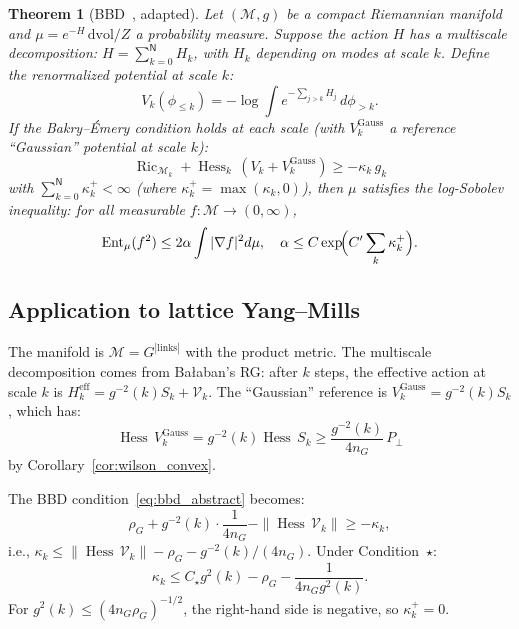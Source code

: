 \documentclass[11pt,a4paper]{article}
\theoremstyle{plain}
\newtheorem{theorem}{Theorem}[section]
\theoremstyle{definition}
\theoremstyle{remark}
\newcommand{\Ent}{\operatorname{Ent}}
\newcommand{\Hess}{\operatorname{Hess}}
\newcommand{\Ric}{\operatorname{Ric}}
\newcommand{\cM}{\mathcal{M}}
\newcommand{\cV}{\mathcal{V}}
\begin{document}
\begin{theorem}[BBD~\cite{BBD24}, adapted]\label{thm:bbd_abstract}
Let $(\cM, g)$ be a compact Riemannian manifold and
$\mu = e^{-H}\,\mathrm{dvol}/Z$ a probability measure.
Suppose the action $H$ has a multiscale decomposition:
$H = \sum_{k=0}^{\mathsf{N}} H_k$, with $H_k$ depending on
modes at scale $k$. Define the renormalized potential
at scale $k$:
\begin{equation}
  V_k(\phi_{\le k}) = -\log \int e^{-\sum_{j > k} H_j}
  \,d\phi_{>k}.
\end{equation}
If the Bakry--\'Emery condition holds at each scale
(with $V_k^{\mathrm{Gauss}}$ a reference ``Gaussian''
potential at scale $k$):
\begin{equation}\label{eq:bbd_abstract}
  \Ric_{\cM_k} + \Hess_{k}\,(V_k + V_k^{\mathrm{Gauss}})
  \ge -\kappa_k\,g_k
\end{equation}
with $\sum_{k=0}^{\mathsf{N}} \kappa_k^+ < \infty$ (where
$\kappa_k^+ = \max(\kappa_k, 0)$), then $\mu$ satisfies the log-Sobolev inequality: for all
measurable $f : \cM \to (0,\infty)$,
\begin{equation}\label{eq:bbd_lsi}
  \Ent_\mu(f^2) \le 2\alpha \int |\nabla f|^2 d\mu,
  \quad \alpha \le C \exp\!\Bigl(C'\sum_k \kappa_k^+\Bigr).
\end{equation}
\end{theorem}

\subsection{Application to lattice Yang--Mills}

The manifold is $\cM = G^{|\text{links}|}$ with the
product metric. The multiscale decomposition comes from
Ba{\l}aban's RG: after $k$ steps, the effective action
at scale $k$ is $H_k^{\mathrm{eff}} = g^{-2}(k) S_k
+ \cV_k$. The ``Gaussian'' reference is
$V_k^{\mathrm{Gauss}} = g^{-2}(k) S_k$, which has:
\begin{equation}\label{eq:gaussian_hess}
  \Hess\,V_k^{\mathrm{Gauss}} = g^{-2}(k) \Hess\,S_k
  \ge \frac{g^{-2}(k)}{4n_G}\,P_\perp
\end{equation}
by Corollary~\ref{cor:wilson_convex}.

The BBD condition~\eqref{eq:bbd_abstract} becomes:
\begin{equation}
  \rho_G + g^{-2}(k) \cdot \frac{1}{4n_G} - \|\Hess\,\cV_k\|
  \ge -\kappa_k,
\end{equation}
i.e., $\kappa_k \le \|\Hess\,\cV_k\| - \rho_G - g^{-2}(k)/(4n_G)$.
Under Condition~$\star$:
\begin{equation}
  \kappa_k \le C_\star g^2(k) - \rho_G - \frac{1}{4n_G g^2(k)}.
\end{equation}
For $g^2(k) \le (4n_G\rho_G)^{-1/2}$, the right-hand
side is negative, so $\kappa_k^+ = 0$.
\end{document}
